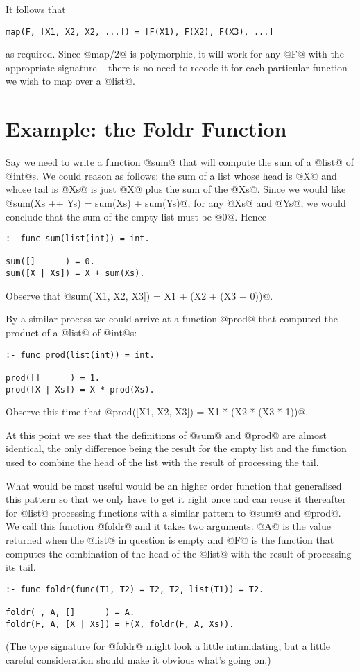 It follows that
\begin{verbatim}
map(F, [X1, X2, X2, ...]) = [F(X1), F(X2), F(X3), ...]
\end{verbatim}
as required.  Since @map/2@ is polymorphic, it will work for any @F@
with the appropriate signature -- there is no need to recode it for each
particular function we wish to map over a @list@.

\section{Example: the Foldr Function}


Say we need to write a function @sum@ that will compute the sum of a
@list@ of @int@s.  We could reason as follows: the sum of a list whose
head is @X@ and whose tail is @Xs@ is just @X@ plus the sum of the @Xs@.
Since we would like @sum(Xs ++ Ys) = sum(Xs) + sum(Ys)@, for any @Xs@
and @Ys@, we would conclude that the sum of the empty list must be @0@.
Hence
\begin{verbatim}
:- func sum(list(int)) = int.

sum([]      ) = 0.
sum([X | Xs]) = X + sum(Xs).
\end{verbatim}
Observe that @sum([X1, X2, X3]) = X1 + (X2 + (X3 + 0))@.

By a similar process we could arrive at a function @prod@ that computed
the product of a @list@ of @int@s:
\begin{verbatim}
:- func prod(list(int)) = int.

prod([]      ) = 1.
prod([X | Xs]) = X * prod(Xs).
\end{verbatim}
Observe this time that @prod([X1, X2, X3]) = X1 * (X2 * (X3 * 1))@.

At this point we see that the definitions of @sum@ and @prod@ are almost
identical, the only difference being the result for the empty list and
the function used to combine the head of the list with the result of
processing the tail.

What would be most useful would be an higher order function that
generalised this pattern so that we only have to get it right once and
can reuse it thereafter for @list@ processing functions with a similar
pattern to @sum@ and @prod@.  We call this function @foldr@ and it takes
two arguments: @A@ is the value returned when the @list@ in question is
empty and @F@ is the function that computes the combination of the head
of the @list@ with the result of processing its tail.
\begin{verbatim}
:- func foldr(func(T1, T2) = T2, T2, list(T1)) = T2.

foldr(_, A, []      ) = A.
foldr(F, A, [X | Xs]) = F(X, foldr(F, A, Xs)).
\end{verbatim}
(The type signature for @foldr@ might look a little intimidating, but a
little careful consideration should make it obvious what's going on.)

